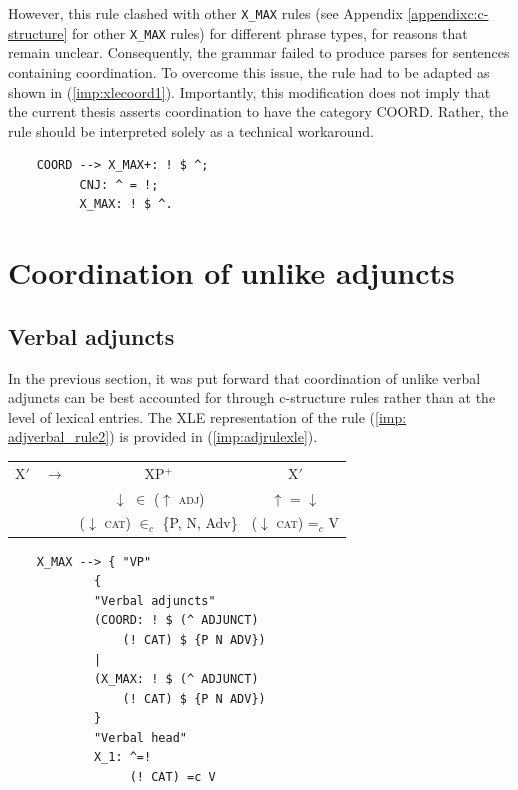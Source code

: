 However, this rule clashed with other \texttt{X\_MAX} rules (see Appendix \ref{appendixc:c-structure} for other \texttt{X\_MAX} rules) for different phrase types, for reasons that remain unclear. Consequently, the grammar failed to produce parses for sentences containing coordination. To overcome this issue, the rule had to be adapted as shown in (\ref{imp:xlecoord1}). Importantly, this modification does not imply that the current thesis asserts coordination to have the category COORD. Rather, the rule should be interpreted solely as a technical workaround.

\pex
\label{imp:xlecoord1}
\vspace{-19pt}

\begin{lstlisting}
	COORD --> X_MAX+: ! $ ^;
		  CNJ: ^ = !;
		  X_MAX: ! $ ^.
\end{lstlisting}
\xe

\section{Coordination of unlike adjuncts}
\subsection{Verbal adjuncts}

In the previous section, it was put forward that coordination of unlike verbal adjuncts can be best accounted for through c-structure rules rather than at the level of lexical entries. The XLE representation of the rule (\ref{imp: adjverbal_rule2}) is provided in (\ref{imp:adjrulexle}).

\pex
\vspace{-12pt}

\label{imp: adjverbal_rule2}
\begin{tabular}{lccc}
	X$'$ & $\longrightarrow$ & XP$^{+}$ & X$'$ \\
	& & $\downarrow$ $\in$ ($\uparrow$ \textsc{adj}) & $\uparrow$ = $\downarrow$ \\
	&			   & ($\downarrow$ \textsc{cat}) $\in_{c}$ \{P, N, Adv\} & ($\downarrow$ \textsc{cat}) =$_{c}$ V  
\end{tabular}
\xe

\pex
\vspace{-18pt}
\label{imp:adjrulexle}

\begin{lstlisting}
	X_MAX --> {	"VP"
			{
			"Verbal adjuncts"
			(COORD: ! $ (^ ADJUNCT)
				(! CAT) $ {P N ADV})
			|
			(X_MAX: ! $ (^ ADJUNCT)
				(! CAT) $ {P N ADV})
			}
			"Verbal head"
			X_1: ^=!
			     (! CAT) =c V
\end{lstlisting}
\xe

